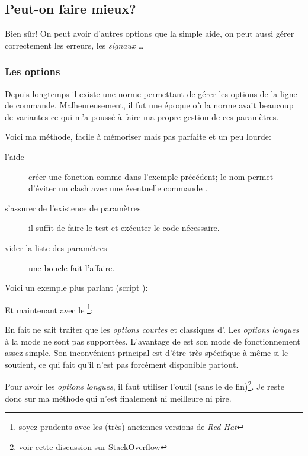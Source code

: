 \subsection{Peut-on faire mieux?}
Bien sûr! On peut avoir d'autres options que la simple aide, on peut aussi gérer correctement les erreurs, les \emph{signaux \unix}\ldots

\subsubsection{Les options}
Depuis longtemps il existe une norme \POSIX{} permettant de gérer les options de la ligne
de commande. Malheureusement, il fut une époque où la norme avait beaucoup de variantes
ce qui m'a poussé à faire ma propre gestion de ces paramètres.

Voici ma méthode, facile à mémoriser mais pas parfaite et un peu lourde:

\begin{description}
    \item[l'aide] créer une fonction  comme dans l'exemple précédent;
    le nom  per\-met d'éviter un clash avec une éventuelle commande .
    \item[s'assurer de l'existence de paramètres] il suffit de faire le test \code{[ \$\# -eq 0 ]} et
    exécuter le code nécessaire.
    \item[vider la liste des paramètres] une boucle  fait l'affaire.
\end{description}

Voici un exemple plus parlant (script ):


Et maintenant avec le \footnote{soyez prudents avec les (très) anciennes versions de \emph{Red Hat}}:


En fait  ne sait traiter que les \emph{options courtes} et classiques d'\unix. Les \emph{options longues}
à la mode \linux{} ne sont pas supportées. L'avantage de  est son mode de fonctionnement
assez simple. Son inconvénient principal est d'être très spécifique à \bash{} même si \POSIX{} le soutient, ce qui fait qu'il
n'est pas forcément disponible partout.

Pour avoir les \emph{options longues}, il faut utiliser l'outil \GNU{}  (sans le  de fin)\footnote{voir cette discussion sur \href{http://stackoverflow.com/questions/402377/using-getopts-in-bash-shell-script-to-get-long-and-short-command-line-options}{StackOverflow}}.
Je reste donc sur ma méthode qui n'est finalement ni meilleure ni pire.

